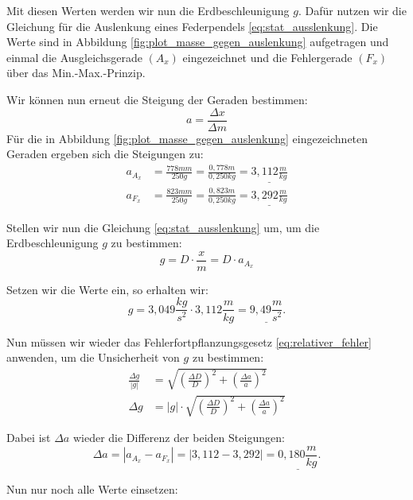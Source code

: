 Mit diesen Werten werden wir nun die Erdbeschleunigung $g$. Dafür nutzen wir die Gleichung für die Auslenkung eines Federpendels \eqref{eq:stat_ausslenkung}.
Die Werte sind in Abbildung \ref{fig:plot_masse_gegen_auslenkung} aufgetragen und einmal die Ausgleichsgerade $(A_x)$ eingezeichnet und die Fehlergerade $(F_x)$ über das Min.-Max.-Prinzip.

Wir können nun erneut die Steigung der Geraden bestimmen:
\begin{equation}
    a = \frac{\Delta x}{\Delta m}
\end{equation}
 Für die in Abbildung \ref{fig:plot_masse_gegen_auslenkung} eingezeichneten Geraden ergeben sich die Steigungen zu:
\begin{align}
    a_{A_x} &= \frac{778 mm}{250 g} = \frac{0,778 m}{0,250 kg} =\underline{3,112 \frac{m}{kg}} \\
    a_{F_x} &= \frac{823 mm}{250 g} = \frac{0,823 m}{0,250 kg} = \underline{3,292 \frac{m}{kg}}
\end{align}

Stellen wir nun die Gleichung \eqref{eq:stat_ausslenkung} um, um die Erdbeschleunigung $g$ zu bestimmen:
\begin{equation}
    g = D \cdot \frac{x}{m} = D \cdot a_{A_x}
\end{equation}

Setzen wir die Werte ein, so erhalten wir:
\begin{equation}
    g = 3,049 \frac{kg}{s^2} \cdot 3,112 \frac{m}{kg} = \underline{9,49 \frac{m}{s^2}}.
\end{equation}

Nun müssen wir wieder das Fehlerfortpflanzungsgesetz \eqref{eq:relativer_fehler} anwenden, um die Unsicherheit von $g$ zu bestimmen:
\begin{align}
    \frac{\Delta g}{\left| g \right|} &= \sqrt{\left(\frac{\Delta D}{D}\right)^2 + \left(\frac{\Delta a}{a}\right)^2} \\
    \Delta g &= \left| g \right| \cdot \sqrt{\left(\frac{\Delta D}{D}\right)^2 + \left(\frac{\Delta a}{a}\right)^2} 
\end{align}

Dabei ist $\Delta a$ wieder die Differenz der beiden Steigungen:
\begin{equation}
    \Delta a = |a_{A_x} - a_{F_x}| = |3,112 - 3,292| = \underline{0,180 \frac{m}{kg}}.
\end{equation}

Nun nur noch alle Werte einsetzen:

